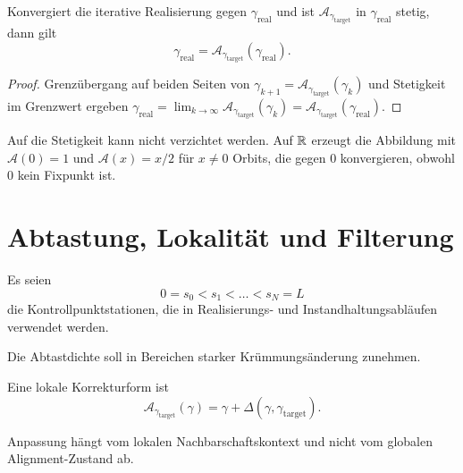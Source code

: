 \begin{proposition}[Fixpunktinterpretation]
\label{prop:realization-fixed-point}
Konvergiert die iterative Realisierung gegen \(\gamma_{\mathrm{real}}\) und
ist \(\mathcal A_{\gamma_{\mathrm{target}}}\) in \(\gamma_{\mathrm{real}}\)
stetig, dann gilt
\[
\gamma_{\mathrm{real}}=
\mathcal A_{\gamma_{\mathrm{target}}}(\gamma_{\mathrm{real}}).
\]
\end{proposition}

\begin{proof}
Grenzübergang auf beiden Seiten von
\(\gamma_{k+1}=\mathcal A_{\gamma_{\mathrm{target}}}(\gamma_k)\) und
Stetigkeit im Grenzwert ergeben
\(\gamma_{\mathrm{real}}
=\lim_{k\to\infty}\mathcal A_{\gamma_{\mathrm{target}}}(\gamma_k)
=\mathcal A_{\gamma_{\mathrm{target}}}(\gamma_{\mathrm{real}})\).
\end{proof}

Auf die Stetigkeit kann nicht verzichtet werden. Auf \(\mathbb{R}\) erzeugt die
Abbildung mit \(\mathcal A(0)=1\) und \(\mathcal A(x)=x/2\) für \(x\neq0\)
Orbits, die gegen \(0\) konvergieren, obwohl \(0\) kein Fixpunkt ist.

\section{Abtastung, Lokalität und Filterung}

\begin{definition}[Kontrollpunkte]
\label{def:control-points}
Es seien
\[
0=s_0<s_1<\dots<s_N=L
\]
die Kontrollpunktstationen, die in Realisierungs- und
Instandhaltungsabläufen verwendet werden.
\end{definition}

\begin{proposition}
\label{prop:adaptive-sampling-principle}
Die Abtastdichte soll in Bereichen starker Krümmungsänderung zunehmen.
\end{proposition}

\begin{definition}
\label{def:local-correction}
Eine lokale Korrekturform ist
\[
\mathcal A_{\gamma_{\mathrm{target}}}(\gamma)
=
\gamma+\Delta(\gamma,\gamma_{\mathrm{target}}).
\]
\end{definition}

\begin{proposition}[Lokalität]
\label{prop:adjustment-locality}
Anpassung hängt vom lokalen Nachbarschaftskontext und nicht vom globalen
Alignment-Zustand ab.
\end{proposition}

